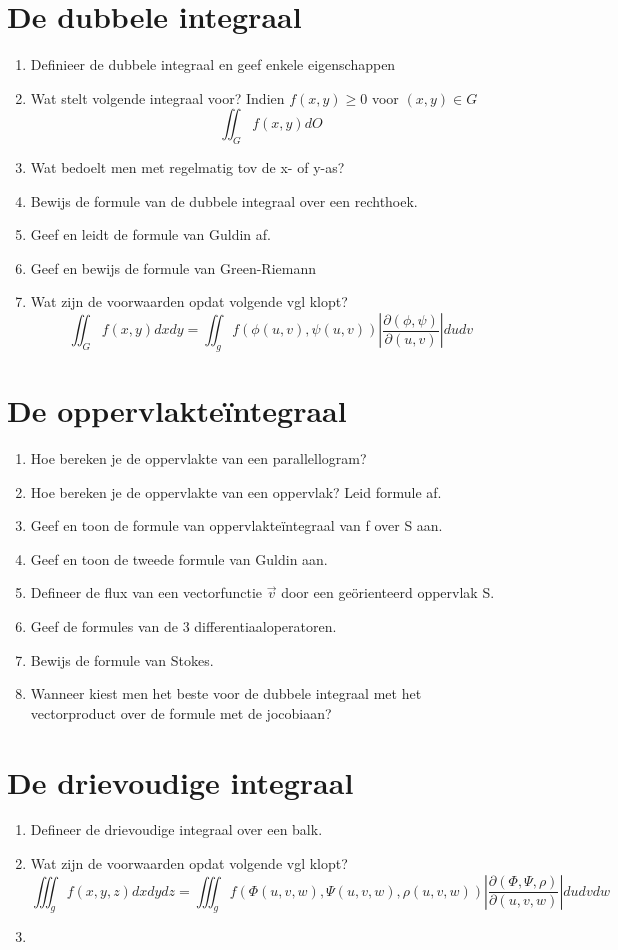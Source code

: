 \documentclass[a4paper,12pt]{article}
\begin{document}
    
    \section{De dubbele integraal}
    \begin{enumerate}
        \item Definieer de dubbele integraal en geef enkele eigenschappen
        \item Wat stelt volgende integraal voor? Indien $f(x,y) \geq 0$ voor $(x,y) \in G$
            $$ \iint_G f(x,y)dO $$
        \item Wat bedoelt men met regelmatig tov de x- of y-as?
        \item Bewijs de formule van de dubbele integraal over een rechthoek.
        \item Geef en leidt de formule van Guldin af.
        \item Geef en bewijs de formule van Green-Riemann
        \item Wat zijn de voorwaarden opdat volgende vgl klopt?
            $$ \iint_G f(x,y)dxdy = \iint_g f(\phi(u,v), \psi(u,v)) \left|\frac{\partial(\phi, \psi)}{\partial(u,v)}\right| dudv $$
    \end{enumerate}

    \section{De oppervlakte\"integraal}
    \begin{enumerate}
        \item Hoe bereken je de oppervlakte van een parallellogram?
        \item Hoe bereken je de oppervlakte van een oppervlak? Leid formule af.
        \item Geef en toon de formule van oppervlakteïntegraal van f over S aan.
        \item Geef en toon de tweede formule van Guldin aan.
        \item Defineer de flux van een vectorfunctie $\vec{v}$ door een geörienteerd oppervlak S.
        \item Geef de formules van de 3 differentiaaloperatoren.
        \item Bewijs de formule van Stokes.
	\item Wanneer kiest men het beste voor de dubbele integraal met het vectorproduct over de formule met de jocobiaan?
    \end{enumerate}
    

    \section{De drievoudige integraal}
    \begin{enumerate}
        \item Defineer de drievoudige integraal over een balk.
        \item Wat zijn de voorwaarden opdat volgende vgl klopt?
        $$\iiint_g f(x,y,z)dxdydz = \iiint_g f(\Phi (u,v,w), \Psi (u,v,w), \rho (u,v,w)) \left|\frac{\partial(\Phi, \Psi, \rho)}{\partial(u,v,w)}\right| dudvdw$$
        \item 
    \end{enumerate}
\end{document}
